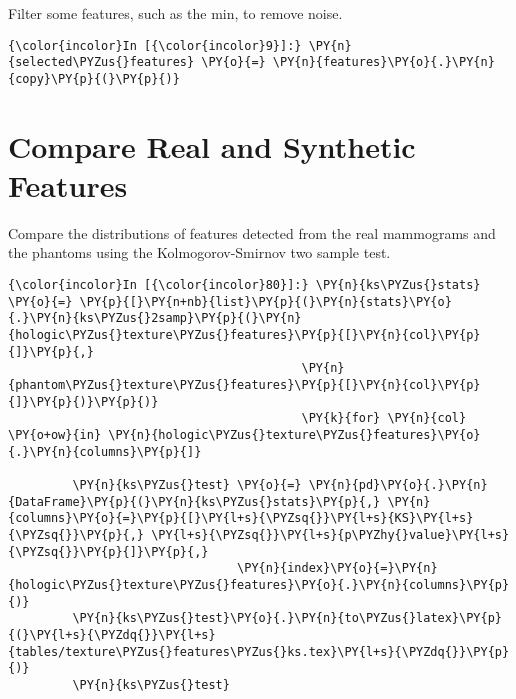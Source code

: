     Filter some features, such as the min, to remove noise.

    \begin{Verbatim}[commandchars=\\\{\}]
{\color{incolor}In [{\color{incolor}9}]:} \PY{n}{selected\PYZus{}features} \PY{o}{=} \PY{n}{features}\PY{o}{.}\PY{n}{copy}\PY{p}{(}\PY{p}{)}
\end{Verbatim}

    \section{Compare Real and Synthetic
Features}\label{compare-real-and-synthetic-features}

    Compare the distributions of features detected from the real mammograms
and the phantoms using the Kolmogorov-Smirnov two sample test.

    \begin{Verbatim}[commandchars=\\\{\}]
{\color{incolor}In [{\color{incolor}80}]:} \PY{n}{ks\PYZus{}stats} \PY{o}{=} \PY{p}{[}\PY{n+nb}{list}\PY{p}{(}\PY{n}{stats}\PY{o}{.}\PY{n}{ks\PYZus{}2samp}\PY{p}{(}\PY{n}{hologic\PYZus{}texture\PYZus{}features}\PY{p}{[}\PY{n}{col}\PY{p}{]}\PY{p}{,}
                                         \PY{n}{phantom\PYZus{}texture\PYZus{}features}\PY{p}{[}\PY{n}{col}\PY{p}{]}\PY{p}{)}\PY{p}{)}
                                         \PY{k}{for} \PY{n}{col} \PY{o+ow}{in} \PY{n}{hologic\PYZus{}texture\PYZus{}features}\PY{o}{.}\PY{n}{columns}\PY{p}{]}

         \PY{n}{ks\PYZus{}test} \PY{o}{=} \PY{n}{pd}\PY{o}{.}\PY{n}{DataFrame}\PY{p}{(}\PY{n}{ks\PYZus{}stats}\PY{p}{,} \PY{n}{columns}\PY{o}{=}\PY{p}{[}\PY{l+s}{\PYZsq{}}\PY{l+s}{KS}\PY{l+s}{\PYZsq{}}\PY{p}{,} \PY{l+s}{\PYZsq{}}\PY{l+s}{p\PYZhy{}value}\PY{l+s}{\PYZsq{}}\PY{p}{]}\PY{p}{,}
                                \PY{n}{index}\PY{o}{=}\PY{n}{hologic\PYZus{}texture\PYZus{}features}\PY{o}{.}\PY{n}{columns}\PY{p}{)}
         \PY{n}{ks\PYZus{}test}\PY{o}{.}\PY{n}{to\PYZus{}latex}\PY{p}{(}\PY{l+s}{\PYZdq{}}\PY{l+s}{tables/texture\PYZus{}features\PYZus{}ks.tex}\PY{l+s}{\PYZdq{}}\PY{p}{)}
         \PY{n}{ks\PYZus{}test}
\end{Verbatim}

